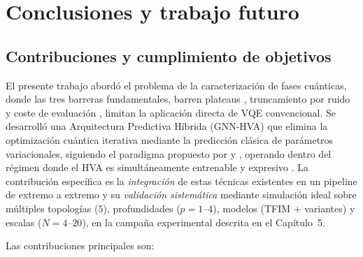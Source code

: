 \documentclass[11pt,a4paper,spanish]{book}
\begin{document}
\chapter{Conclusiones y trabajo futuro}

\section{Contribuciones y cumplimiento de objetivos}

El presente trabajo abordó el problema de la caracterización de fases cuánticas, donde las tres barreras fundamentales, barren plateaus \citep{mcclean2018}, truncamiento por ruido \citep{mele2026} y coste de evaluación \citep{tilly2022}, limitan la aplicación directa de VQE convencional. Se desarrolló una Arquitectura Predictiva Híbrida (GNN-HVA) que elimina la optimización cuántica iterativa mediante la predicción clásica de parámetros variacionales, siguiendo el paradigma propuesto por \citet{miao2024} y \citet{zhang2025}, operando dentro del régimen donde el HVA es simultáneamente entrenable \citep{cerezo2021} y expresivo \citep{wiersema2020}. La contribución específica es la \emph{integración} de estas técnicas existentes en un pipeline de extremo a extremo y su \emph{validación sistemática} mediante simulación ideal sobre múltiples topologías ($5$), profundidades ($p = 1$--$4$), modelos (TFIM + variantes) y escalas ($N = 4$--$20$), en la campaña experimental descrita en el Capítulo~5.

Las contribuciones principales son:
\end{document}

